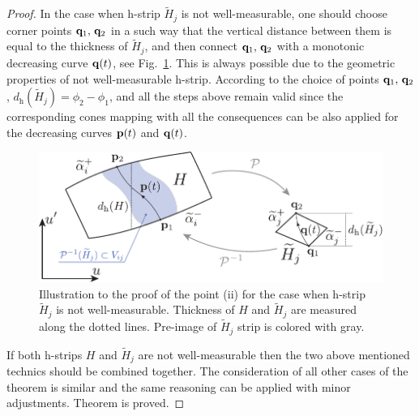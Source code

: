 \begin{proof}
	In the case when h-strip $\widetilde{H}_j$ is not well-measurable, one should choose corner points $\vb{q}_1, \, \vb{q}_2$ in a such way that the vertical distance between them is equal to the thickness of $\widetilde{H}_j$, and then connect $\vb{q}_1, \, \vb{q}_2$ with a monotonic decreasing curve $\vb{q}(t)$, see Fig.~\ref{fig:thickness-of-h-strip-c}.
	This is always possible due to the geometric properties of not well-measurable h-strip.
	According to the choice of points $\vb{q}_1, \, \vb{q}_2$, $d_{\mathrm{h}}(\widetilde{H}_j) = \phi_2 - \phi_1$, and all the steps above remain valid since the corresponding cones mapping with all the consequences can be also applied for the decreasing curves $\vb{p}(t)$ and $\vb{q}(t)$.
	\begin{figure}[h]
	\centering
		\includegraphics[scale = 1]{pic/thickness of h-strip (c)}
		\caption{
			Illustration to the proof of the point (ii) for the case when h-strip $\widetilde{H}_j$ is not well-measurable.
			Thickness of $H$ and $\widetilde{H}_j$ are measured along the dotted lines.
			Pre-image of $\widetilde{H}_j$ strip is colored with gray.
	  }
	\label{fig:thickness-of-h-strip-c}
	\end{figure}
	
	If both h-strips $H$ and $\widetilde{H}_j$ are not well-measurable then the two above mentioned technics should be combined together.
	The consideration of all other cases of the theorem is similar and the same reasoning can be applied with minor adjustments.
	Theorem is proved.
\end{proof}

\pagebreak

